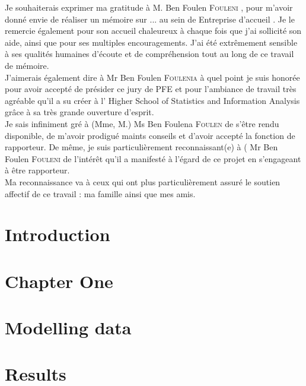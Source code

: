 \documentclass[a4paper, oneside]{report}
\newcommand{\studyDepartment} {%
  Entreprise d'accueil %
}
\newcommand{\ESSAI} {%
  Higher School of Statistics and Information Analysis
}
\newcommand{\juryPresident} {%
  Mr Ben Foulen \textsc{Foulenia}%
}
\newcommand{\juryMemberOne} {%
  Ms Ben Foulena \textsc{Foulen}%
}
\newcommand{\juryMemberTwo} {%
  Mr Ben Foulen \textsc{Fouleni}%
}
\newcommand{\juryMemberThree} {%
	M. Ben Foulen \textsc{Fouleni}%
}
\begin{document}
Je souhaiterais exprimer ma gratitude à \juryMemberThree{}, pour m’avoir donné envie de réaliser un mémoire sur ... au sein de \studyDepartment. Je le remercie également pour son accueil chaleureux à chaque fois que j'ai sollicité son aide, ainsi que pour ses multiples encouragements. J’ai été extrêmement sensible à ses qualités humaines d'écoute et de compréhension tout au long de ce travail de mémoire. \\

J'aimerais également dire à \juryPresident{} à quel point je suis honorée pour avoir accepté de présider ce jury de PFE et pour l’ambiance de travail très agréable qu’il a su créer à l'\ESSAI grâce à sa très grande ouverture d’esprit. \\

Je sais infiniment gré à (Mme, M.) \juryMemberOne{} de s’être rendu disponible, de m’avoir prodigué maints conseils et d’avoir accepté la fonction de rapporteur. De même, je suis particulièrement reconnaissant(e) à (\juryMemberTwo{} de l’intérêt qu’il a manifesté à l’égard de ce projet en s’engageant à être rapporteur. \\

Ma reconnaissance va à ceux qui ont plus particulièrement assuré le soutien affectif de ce travail : ma famille ainsi que mes amis. 





\chapter*{Introduction}
\label{chap:general_intorduction}
%
%



\chapter{Chapter One}%
\label{chap:chapterone}



\chapter{Modelling data}
\label{chap:2}


\chapter{Results}
\label{chap:3}
%
%

\end{document}
